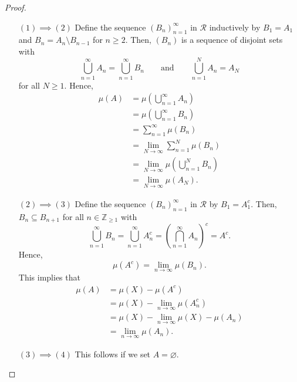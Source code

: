 \documentclass[a4paper, openany]{memoir}
\theoremstyle{definition}
\theoremstyle{plain}
\begin{document}
    \begin{proof}
        \hspace{0pt}
        \begin{itemize}
            \item[$(1) \implies (2)$] Define the sequence $(B_n)_{n=1}^\infty$ in $\mathcal{R}$ inductively by $B_1 = A_1$ and $B_n = A_n \setminus B_{n-1}$ for $n \geq 2$. Then, $(B_n)$ is a sequence of disjoint sets with
            \[\bigcup_{n=1}^\infty A_n = \bigcup_{n=1}^\infty B_n \qquad \textrm{and} \qquad \bigcup_{n=1}^N A_n = A_N\]
            for all $N \geq 1$. Hence,
            \begin{align*}
                \mu(A) &= \mu \left(\bigcup_{n=1}^\infty A_n\right) \\
                &= \mu \left(\bigcup_{n=1}^\infty B_n\right) \\
                &= \sum_{n=1}^\infty \mu(B_n) \\
                &= \lim_{N \to \infty} \sum_{n=1}^N \mu(B_n) \\
                &= \lim_{N \to \infty} \mu \left(\bigcup_{n=1}^N B_n\right) \\
                &= \lim_{N \to \infty} \mu(A_N).
            \end{align*}

            \item[$(2) \implies (3)$] Define the sequence $(B_n)_{n=1}^\infty$ in $\mathcal{R}$ by $B_1 = A_1^c$. Then, $B_n \subseteq B_{n+1}$ for all $n \in \mathbb{Z}_{\geq 1}$ with
            \[\bigcup_{n=1}^\infty B_n = \bigcup_{n=1}^\infty A_n^c = \left(\bigcap_{n=1}^\infty A_n\right)^c = A^c.\]
            Hence,
            \[\mu(A^c) = \lim_{n \to \infty} \mu(B_n).\]
            This implies that
            \begin{align*}
                \mu(A) &= \mu(X) - \mu(A^c) \\
                &= \mu(X) - \lim_{n \to \infty} \mu(A_n^c) \\
                &= \mu(X) - \lim_{n \to \infty} \mu(X) - \mu(A_n) \\
                &= \lim_{n \to \infty} \mu(A_n).
            \end{align*}
            
            \item[$(3) \implies (4)$] This follows if we set $A = \varnothing$.
            

\end{itemize}
\end{proof}
\end{document}
